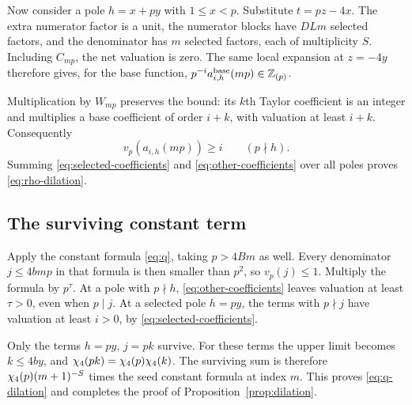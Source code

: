 Now consider a pole $h=x+py$ with $1\le x<p$. Substitute
$t=pz-4x$. The extra numerator factor is a unit, the numerator
blocks have $DLm$ selected factors, and the denominator has $m$
selected factors, each of multiplicity $S$. Including $C_{mp}$,
the net valuation is zero. The same local expansion at $z=-4y$
therefore gives, for the base function,
$p^{-i}a^{\rm base}_{i,h}(mp)\in\mathbb Z_{(p)}$.

Multiplication by $W_{mp}$ preserves the bound: its $k$th Taylor
coefficient is an integer and multiplies a base coefficient of order
$i+k$, with valuation at least $i+k$. Consequently
\begin{equation}\label{eq:other-coefficients}
 v_p(a_{i,h}(mp))\ge i\qquad(p\nmid h).
\end{equation}
Summing \eqref{eq:selected-coefficients} and
\eqref{eq:other-coefficients} over all poles proves
\eqref{eq:rho-dilation}.

\subsection{The surviving constant term}

Apply the constant formula \eqref{eq:q}, taking $p>4Bm$ as well.
Every denominator $j\le4bmp$ in that formula is then smaller than
$p^2$, so $v_p(j)\le1$. Multiply the formula by $p^\tau$.
At a pole with $p\nmid h$, \eqref{eq:other-coefficients} leaves
valuation at least $\tau>0$, even when $p\mid j$. At a selected
pole $h=py$, the terms with $p\nmid j$ have valuation at least
$i>0$, by \eqref{eq:selected-coefficients}.

Only the terms $h=py$, $j=pk$ survive. For these terms the upper
limit becomes $k\le4by$, and
$\chi_4(pk)=\chi_4(p)\chi_4(k)$. The surviving sum is therefore
$\chi_4(p)(m+1)^{-S}$ times the seed constant formula at index $m$.
This proves \eqref{eq:q-dilation} and completes the proof of
Proposition~\ref{prop:dilation}.
